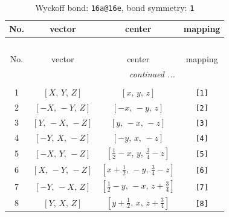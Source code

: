 \documentclass[fleqn,8pt]{jsarticle}
\begin{document}
\begin{longtable}{cccc}
\caption{Wyckoff bond: {\tt 16a@16e}, bond symmetry: {\tt 1}}
 \\
 \hline \hline
No. & vector & center & mapping \\ \hline \endfirsthead

\multicolumn{3}{l}{\tablename\ \thetable{}} \\
 \hline \hline
No. & vector & center & mapping \\ \hline \endhead

 \hline \hline
\multicolumn{3}{r}{\footnotesize\it continued ...} \\ \endfoot

 \hline \hline
\multicolumn{3}{r}{} \\ \endlastfoot

1 & $\left[ X,\, Y,\, Z \right]$ & $\left[ x,\, y,\, z \right]$ & {\tt [1]} \\ \hline
2 & $\left[ - X,\, - Y,\, Z \right]$ & $\left[ - x,\, - y,\, z \right]$ & {\tt [2]} \\ \hline
3 & $\left[ Y,\, - X,\, - Z \right]$ & $\left[ y,\, - x,\, - z \right]$ & {\tt [3]} \\ \hline
4 & $\left[ - Y,\, X,\, - Z \right]$ & $\left[ - y,\, x,\, - z \right]$ & {\tt [4]} \\ \hline
5 & $\left[ - X,\, Y,\, - Z \right]$ & $\left[ \frac{1}{2} - x,\, y,\, \frac{3}{4} - z \right]$ & {\tt [5]} \\ \hline
6 & $\left[ X,\, - Y,\, - Z \right]$ & $\left[ x + \frac{1}{2},\, - y,\, \frac{3}{4} - z \right]$ & {\tt [6]} \\ \hline
7 & $\left[ - Y,\, - X,\, Z \right]$ & $\left[ \frac{1}{2} - y,\, - x,\, z + \frac{3}{4} \right]$ & {\tt [7]} \\ \hline
8 & $\left[ Y,\, X,\, Z \right]$ & $\left[ y + \frac{1}{2},\, x,\, z + \frac{3}{4} \right]$ & {\tt [8]} \\
\end{longtable}
\end{document}
